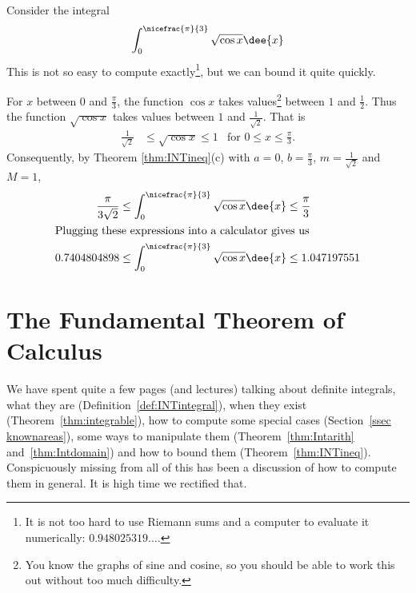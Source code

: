 \begin{eg}
Consider the integral
\begin{align*}
\int_0^{\nicefrac{\pi}{3}}\sqrt{\cos x}\dee{x}
\end{align*}
This is not so easy to compute exactly\footnote{It is not too hard to use
Riemann sums and a computer to evaluate it numerically: $0.948025319\dots$.},
but we can bound it quite quickly.

For $x$ between $0$ and $\frac{\pi}{3}$, the function $\cos x$ takes
values\footnote{You know the graphs of sine and cosine, so you should be
able to work this out without too much difficulty.}
between $1$ and $\frac{1}{2}$. Thus the function $\sqrt{\cos x}$ takes
values between $1$ and $\frac{1}{\sqrt{2}}$. That is
\begin{align*}
 \frac{1}{\sqrt{2}} &\le \sqrt{\cos x} \le 1
& \text{for $0\le x\le \frac{\pi}{3}$}.
\end{align*}
Consequently, by Theorem \ref{thm:INTineq}(c) with
$a=0$, $b=\frac{\pi}{3}$, $m= \frac{1}{\sqrt{2}}$ and $M=1$,
\begin{align*}
\frac{\pi}{3\sqrt{2}} &\le \int_0^{\nicefrac{\pi}{3}} \sqrt{\cos x}\dee{x}
            \le \frac{\pi}{3}\\
\intertext{Plugging these expressions into a calculator gives us}
0.7404804898 & \le \int_0^{\nicefrac{\pi}{3}} \sqrt{\cos x}\dee{x}
\leq 1.047197551
\end{align*}
\end{eg}


\section{The Fundamental Theorem of Calculus}\label{sec fundamental}
We have spent quite a few pages (and lectures) talking about definite
integrals, what they are (Definition~\ref{def:INTintegral}), when they
exist (Theorem~\ref{thm:integrable}), how to compute some special
cases (Section~\ref{ssec knownareas}), some ways to manipulate them
(Theorem~\ref{thm:Intarith} and~\ref{thm:Intdomain}) and how to bound them
(Theorem~\ref{thm:INTineq}). Conspicuously missing from all of this has been a
discussion of how to compute them in general. It is high time we rectified
that.

